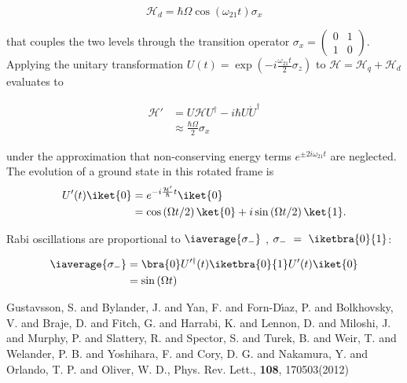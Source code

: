 \begin{thebibliography}{99}
  \begin{equation}
    \label{eq:rabi2}
    \mathcal{H}_{d} = \hbar\Omega\cos(\omega_{21}t)\sigma_{x}
  \end{equation}

  \noindent  that  couples  the  two   levels  through  the  transition  operator
  $\sigma_x    =    \ensuremath{\left(\begin{smallmatrix}   0    &    1    \\   1    &
        0  \end{smallmatrix}\right)}  $.   Applying  the  unitary  transformation
  $    U(t)     =    \exp     \left(-i    \frac{\omega_{21}t}{2}\sigma_z\right)     $    to
  $ \mathcal{H} = \mathcal{H}_{q}+\mathcal{H}_{d} $ evaluates to

  \begin{equation}
    \label{eq:rabi3}
    \begin{aligned}
      \mathcal{H}'& = U\mathcal{H}U^{\dag} - i\hbar U\dot{U}^{\dag}\\
      & \approx \frac{\hbar\Omega}{2}\sigma_x
    \end{aligned}
  \end{equation}

  \noindent   under   the   approximation  that   non-conserving   energy   terms
  $ e^{\pm 2i\omega_{21}t}  $ are neglected. The  evolution of a ground  state in this
  rotated frame is
  \begin{equation}
    \label{eq:rabi4}
    \begin{aligned}
      U'(t)\iket{0} & = e^{-i\frac{\mathcal{H'}}{\hbar}t}\iket{0} \\
      & = \cos\left({\Omega t}/{2}\right)\ket{0}+i\sin\left({\Omega t}/{2}\right)\ket{1}.
    \end{aligned}
  \end{equation}

  \noindent  Rabi   oscillations  are   proportional  to  $   \iaverage{\sigma_{-}}  $
  \cite{Astafiev2010}, $\sigma_{-}~=~\iketbra{0}{1}$:

  \begin{equation}
    \label{eq:rabi5}
    \begin{aligned}
      \iaverage{\sigma_{-}} & = \bra{0}U'^{\dag}(t) \iketbra{0}{1} U'(t)\iket{0}\\
      & = \sin \left(\Omega t\right)
    \end{aligned}
  \end{equation}

  {Gustavsson, S.   and  Bylander, J.  and  Yan, F.   and
    Forn-D\'{\i}az, P.  and Bolkhovsky,  V.  and  Braje, D.   and Fitch,  G.  and
    Harrabi,  K. and  Lennon, D.  and Miloshi,  J. and  Murphy, P.  and Slattery,
    R.  and Spector,  S. and  Turek, B.  and  Weir, T.  and Welander,  P. B.  and
    Yoshihara,  F. and  Cory, D.   G. and  Nakamura, Y.  and Orlando,  T. P.  and
    Oliver, W. D.}, {Phys. Rev. Lett.}, \textbf{108}, 170503(2012)



\end{thebibliography}
